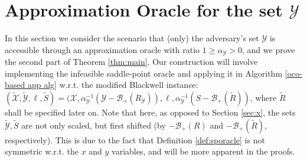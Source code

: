 \documentclass[a4paper,12pt]{article}
\newcommand{\mY}{\mathcal{Y}}
\newcommand{\mX}{\mathcal{X}}
\newcommand{\tY}{\tilde{\mathcal{Y}}}
\newcommand{\tX}{\tilde{\mathcal{X}}}
\newcommand{\tS}{\tilde{S}}
\newcommand{\mB}{\mathcal{B}}
\newcommand{\oracley}{\mathcal{O}_{\mY}}
\begin{document}
\section{Approximation Oracle for the set $\mY$}\label{sec:y}
In this section we consider the scenario that (only) the adversary's set $\mY$ is accessible through an approximation oracle with ratio $1 \geq \alpha_{\mY} > 0$, and we prove the second part of Theorem \ref{thm:main}. Our construction will involve implementing the infeasible saddle-point oracle and applying it in Algorithm \ref{oco-based app  alg} w.r.t. the modified Blackwell instance: $(\tX,\tY,\ell,\tS) = (\mX, \alpha_{\mY}^{-1}(\mY-\mB_+(R_{\mY})), \ell, \alpha_{\mY}^{-1}(S-\mB_+(\tilde{R}))$, where $\tilde{R}$ shall be specified later on. Note that here, as opposed to Section \ref{sec:x}, the sets $\tY,\tS$ are not only scaled, but first shifted (by $-\mB_+(R)$ and $-\mB_+(\tilde{R})$, respectively). This is due to the fact that Definition \ref{def:sporacle} is not symmetric w.r.t. the $x$ and $y$ variables, and will be more apparent in the proofs.
\end{document}
